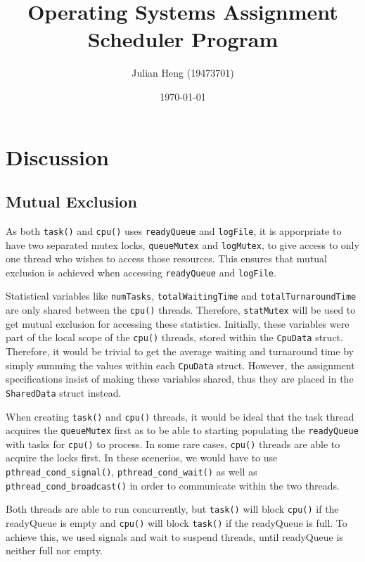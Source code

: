 \documentclass[a4paper, 12pt, titlepage]{article}
\title{\huge \textbf{Operating Systems Assignment\\Scheduler Program}}
\author{Julian Heng (19473701)}
\date{\today}
\newcommand{\code}[1]{\small\texttt{#1}\normalsize}
\begin{document}
\maketitle
\tableofcontents
\newpage

\pagestyle{fancy}

\fancyhf[FC]{\thepage}

\section{Discussion}

\subsection{Mutual Exclusion}
As both \code{task()} and \code{cpu()} uses \code{readyQueue} and
\code{logFile}, it is apporpriate to have two separated mutex locks,
\code{queueMutex} and \code{logMutex}, to give access to only one thread who
wishes to access those resources. This ensures that mutual exclusion is
achieved when accessing \code{readyQueue} and \code{logFile}.

Statistical variables like \code{numTasks}, \code{totalWaitingTime} and
\code{totalTurnaroundTime} are only shared between the \code{cpu()} threads.
Therefore, \code{statMutex} will be used to get mutual exclusion for accessing
these statistics. Initially, these variables were part of the local scope of
the \code{cpu()} threads, stored within the \code{CpuData} struct.  Therefore,
it would be trivial to get the average waiting and turnaround time by simply
summing the values within each \code{CpuData} struct. However, the assignment
specifications insist of making these variables shared, thus they are placed in
the \code{SharedData} struct instead.

When creating \code{task()} and \code{cpu()} threads, it would be ideal that
the task thread acquires the \code{queueMutex} first as to be able to starting
populating the \code{readyQueue} with tasks for \code{cpu()} to process. In
some rare cases, \code{cpu()} threads are able to acquire the locks first. In
these scenerios, we would have to use
\code{pthread\string_cond\string_signal()},
\code{pthread\string_cond\string_wait()} as well as
\code{pthread\string_cond\string_broadcast()} in order to communicate within
the two threads.

Both threads are able to run concurrently, but \code{task()} will block
\code{cpu()} if the readyQueue is empty and \code{cpu()} will block
\code{task()} if the readyQueue is full. To achieve this, we used signals and
wait to suspend threads, until readyQueue is neither full nor empty.
\end{document}
